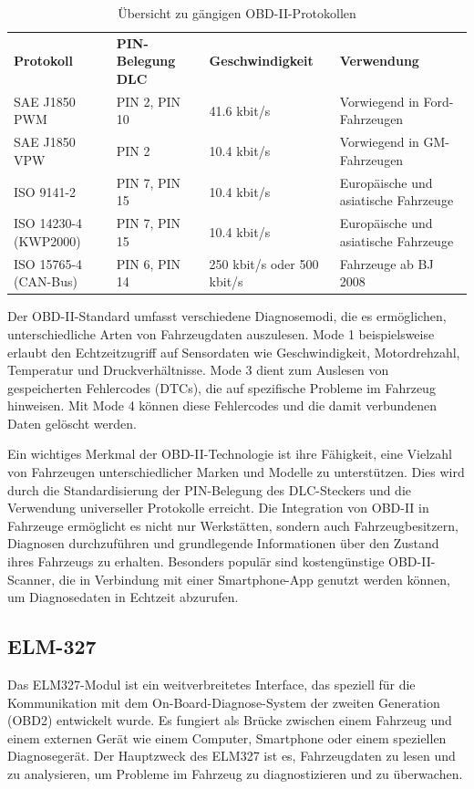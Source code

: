 \documentclass[oneside]{ausarbeitung}
\begin{document}
\begin{table}[h!]
  \centering
  \begin{adjustbox}{width=\textwidth}
  \begin{tabular}{|l|l|l|l|}
  \textbf{Protokoll} & \textbf{PIN-Belegung DLC} & \textbf{Geschwindigkeit} & \textbf{Verwendung} \\ 
  SAE J1850 PWM & PIN 2, PIN 10 & 41.6 kbit/s & Vorwiegend in Ford-Fahrzeugen \\ 
  SAE J1850 VPW & PIN 2 & 10.4 kbit/s & Vorwiegend in GM-Fahrzeugen \\ 
  ISO 9141-2 & PIN 7, PIN 15 & 10.4 kbit/s & Europäische und asiatische Fahrzeuge \\ 
  ISO 14230-4 (KWP2000) & PIN 7, PIN 15 & 10.4 kbit/s & Europäische und asiatische Fahrzeuge \\ 
  ISO 15765-4 (CAN-Bus) & PIN 6, PIN 14 & 250 kbit/s oder 500 kbit/s & Fahrzeuge ab BJ 2008 \\ 
  \end{tabular}
  \end{adjustbox}
  \caption{Übersicht zu gängigen OBD-II-Protokollen}
  \label{tab:obd_protocols}
\end{table}

Der OBD-II-Standard umfasst verschiedene Diagnosemodi, die es ermöglichen, unterschiedliche Arten von Fahrzeugdaten auszulesen. Mode 1 beispielsweise erlaubt den Echtzeitzugriff auf Sensordaten wie Geschwindigkeit, Motordrehzahl, Temperatur und Druckverhältnisse. Mode 3 dient zum Auslesen von gespeicherten Fehlercodes (DTCs), die auf spezifische Probleme im Fahrzeug hinweisen. Mit Mode 4 können diese Fehlercodes und die damit verbundenen Daten gelöscht werden.

Ein wichtiges Merkmal der OBD-II-Technologie ist ihre Fähigkeit, eine Vielzahl von Fahrzeugen unterschiedlicher Marken und Modelle zu unterstützen. Dies wird durch die Standardisierung der PIN-Belegung des DLC-Steckers und die Verwendung universeller Protokolle erreicht. Die Integration von OBD-II in Fahrzeuge ermöglicht es nicht nur Werkstätten, sondern auch Fahrzeugbesitzern, Diagnosen durchzuführen und grundlegende Informationen über den Zustand ihres Fahrzeugs zu erhalten. Besonders populär sind kostengünstige OBD-II-Scanner, die in Verbindung mit einer Smartphone-App genutzt werden können, um Diagnosedaten in Echtzeit abzurufen.

\subsection*{ELM-327}
\label{subsec:foundations:elm327}
Das ELM327-Modul ist ein weitverbreitetes Interface, das speziell für die Kommunikation mit dem On-Board-Diagnose-System der zweiten Generation (OBD2) entwickelt wurde. Es fungiert als Brücke zwischen einem Fahrzeug und einem externen Gerät wie einem Computer, Smartphone oder einem speziellen Diagnosegerät. Der Hauptzweck des ELM327 ist es, Fahrzeugdaten zu lesen und zu analysieren, um Probleme im Fahrzeug zu diagnostizieren und zu überwachen.
\end{document}
